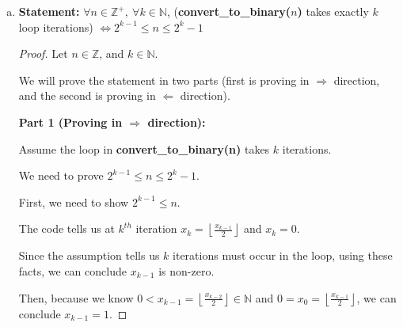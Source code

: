 \documentclass[12pt]{article}
\begin{document}
\begin{enumerate}[a.]
\begin{proof}
        \bigskip

        Then, by the inductive hypothesis, we can conclude

        \begin{align}
            x_{k+1} &\leq \frac{n}{2^k \cdot 2}\\
            &\leq \frac{n}{2^{k+1}}
        \end{align}
    \end{proof}

    \item

    \textbf{Statement:} $\forall n \in \mathbb{Z}^{+},\:\forall k \in \mathbb{N}$,
    (\textbf{convert\_to\_binary($n$)} takes exactly $k$ loop iterations) $\Leftrightarrow 2^{k-1} \leq n \leq 2^k - 1$

    \bigskip

    \begin{proof}
        Let $n \in \mathbb{Z}$, and $k \in \mathbb{N}$.

        \bigskip

        We will prove the statement in two parts (first is proving in $\Rightarrow$
        direction, and the second is proving in $\Leftarrow$ direction).

        \bigskip

        \textbf{Part 1 (Proving in $\Rightarrow$ direction):}

        \bigskip

        Assume the loop in \textbf{convert\_to\_binary(n)} takes $k$ iterations.

        \bigskip

        We need to prove $2^{k-1} \leq n \leq 2^k - 1$.

        \bigskip

        First, we need to show $2^{k-1} \leq n$.

        \bigskip

        The code tells us at $k^{th}$ iteration $x_k = \left\lfloor
        \frac{x_{k-1}}{2} \right\rfloor$ and $x_k = 0$.

        \bigskip

        Since the assumption tells us $k$ iterations must occur in the loop,
        using these facts, we can conclude $x_{k-1}$ is non-zero.

        \bigskip

        Then, because we know $0 < x_{k-1} = \left\lfloor \frac{x_{k-2}}{2} \right\rfloor \in \mathbb{N}$ and
        $0 = x_0 = \left\lfloor \frac{x_{k-1}}{2} \right\rfloor$, we can conclude $x_{k-1} = 1$.


\end{proof}
\end{enumerate}
\end{document}
